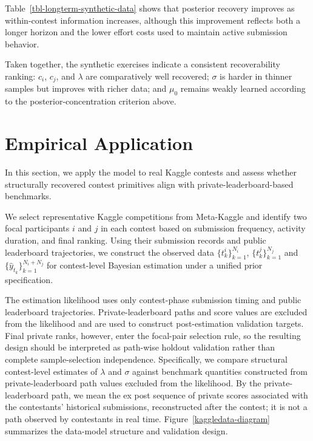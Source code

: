 \documentclass[mnsc]{informs3}
\begin{document}
Table~\ref{tbl-longterm-synthetic-data} shows that posterior recovery improves as within-contest information increases, although this improvement reflects both a longer horizon and the lower effort costs used to maintain active submission behavior.

Taken together, the synthetic exercises indicate a consistent recoverability ranking: $c_i$, $c_j$, and $\lambda$ are comparatively well recovered; $\sigma$ is harder in thinner samples but improves with richer data; and $\mu_0$ remains weakly learned according to the posterior-concentration criterion above.




\section{Empirical Application}
\label{sec-kaggle-application}

In this section, we apply the model to real Kaggle contests and assess whether structurally recovered contest primitives align with private-leaderboard-based benchmarks.

We select representative Kaggle competitions from Meta-Kaggle and identify two focal participants $i$ and $j$ in each contest based on submission frequency, activity duration, and final ranking.
Using their submission records and public leaderboard trajectories, we construct the observed data $\{t^i_k\}^{N_i}_{k=1}$, $\{t^j_k\}^{N_j}_{k=1}$ and $\{\hat{y}_{t_k}\}_{k=1}^{N_i+N_j}$ for contest-level Bayesian estimation under a unified prior specification.

The estimation likelihood uses only contest-phase submission timing and public leaderboard trajectories. Private-leaderboard paths and score values are excluded from the likelihood and are used to construct post-estimation validation targets. Final private ranks, however, enter the focal-pair selection rule, so the resulting design should be interpreted as path-wise holdout validation rather than complete sample-selection independence.
Specifically, we compare structural contest-level estimates of $\lambda$ and $\sigma$ against benchmark quantities constructed from private-leaderboard path values excluded from the likelihood.
By the private-leaderboard path, we mean the ex post sequence of private scores associated with the contestants' historical submissions, reconstructed after the contest; it is not a path observed by contestants in real time.
Figure~\ref{kaggledata-diagram} summarizes the data-model structure and validation design.
\end{document}
